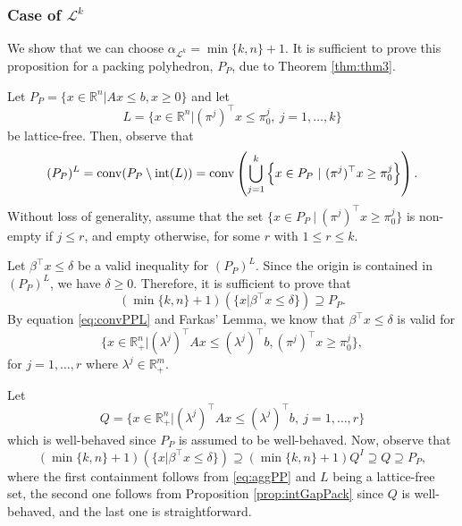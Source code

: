 \documentclass[11pt]{article}
\newcommand{\R}{\mathbb{R}}
\DeclareMathOperator{\conv}{conv}
\renewcommand{\L}{\mathcal{L}}
\newcommand{\bpar}{\beta}
\newcommand{\cred}{\color{black}}
\def\conv{\mathop{\rm conv}}
\def\int{\mathop{\rm int}}
\begin{document}
\subsubsection{Case of $\L^k$}
\label{subsubsec:4.5.3}

We show that {\cred we can choose $\alpha_{\L^k} = \min \{ k,n \}+1$}. It is sufficient to prove this proposition for a packing polyhedron, $P_P$, due to Theorem \ref{thm:thm3}.

Let $P_P = \{ x \in \R^n | Ax \leq b, x \geq 0\}$ and {\cred let}
$$L = \{ x \in \R^n | (\pi^j)^\top x \leq \pi^j_0, \ j = 1,\hdots,k \}$$
{\cred be lattice-free.}
Then, observe that 
\begin{equation}
\label{eq:convPPL}
(P_P)^L = \conv (P_P \setminus \int(L)) = \conv  \left(\bigcup_{j=1}^k \left\{ x \in P_P ~|~ (\pi^j)^\top x \geq \pi^j_0 \right\}  \right).
\end{equation}
Without loss of generality, assume that the set $\{ x \in P_P ~|~ (\pi^j)^\top x \geq \pi^j_0 \}$ is non-empty if $j \leq r$, and empty otherwise, for some $r$ with $1 \leq r \leq k$.

Let $\bpar^\top x \leq \delta$ be a valid inequality for $(P_P)^L$. Since the origin is contained in $(P_P)^L$, we have $\delta \geq 0$. Therefore, it is sufficient to prove that 
$$(\min\{k,n\}+1) \left(  \{ x | \bpar^\top x \leq \delta \} \right) \supseteq  P_P.$$
By equation \eqref{eq:convPPL} and Farkas' Lemma, we know that $\bpar^\top x \leq \delta$ is valid for 
\begin{equation}
\label{eq:aggPP}
\{ x \in \R_+^n | (\lambda^j)^\top A x \leq (\lambda^j)^\top b, (\pi^j)^\top x \geq \pi^j_0 \},
\end{equation}
for $j = 1,\hdots,r$ where $\lambda^j \in \R_+^m$.

Let 
$$Q = \{ x \in \R_+^n | (\lambda^j)^\top A x \leq (\lambda^j)^\top b, \ j = 1,\hdots,r \} $$
which is well-behaved since $P_P$ is assumed to be well-behaved. Now, observe that 
$$(\min\{k,n\}+1) \left(  \{ x | \bpar^\top x \leq \delta \} \right) \supseteq (\min\{k,n\}+1) Q^I \supseteq Q \supseteq P_P,$$
where the first containment follows from \eqref{eq:aggPP} and $L$ being a lattice-free set, the second one follows from {\cred Proposition \ref{prop:intGapPack}} since $Q$ is well-behaved, and the last one is straightforward.
\end{document}
